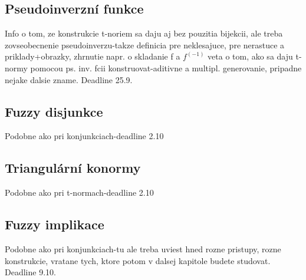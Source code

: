 \begin{graph}
    
\end{graph}

\subsection{Pseudoinverzn\'i funkce} Info o tom, ze konstrukcie t-noriem sa daju aj bez pouzitia bijekcii, ale treba zovseobecnenie pseudoinverzu-takze definicia pre neklesajuce, pre nerastuce a priklady+obrazky, zhrnutie napr. o skladanie f a $f^{(-1)}$ veta o tom, ako sa daju t-normy pomocou ps. inv. fcii konstruovat-aditivne a multipl. generovanie, pripadne nejake dalsie zname. Deadline 25.9.
\subsection{Fuzzy disjunkce} Podobne ako pri konjunkciach-deadline 2.10
\subsection{Triangul\'arn\'i konormy} Podobne ako pri t-normach-deadline 2.10
\subsection{Fuzzy implikace} Podobne ako pri konjunkciach-tu ale treba uviest hned rozne pristupy, rozne konstrukcie, vratane tych, ktore potom v dalsej kapitole budete studovat. Deadline 9.10.

